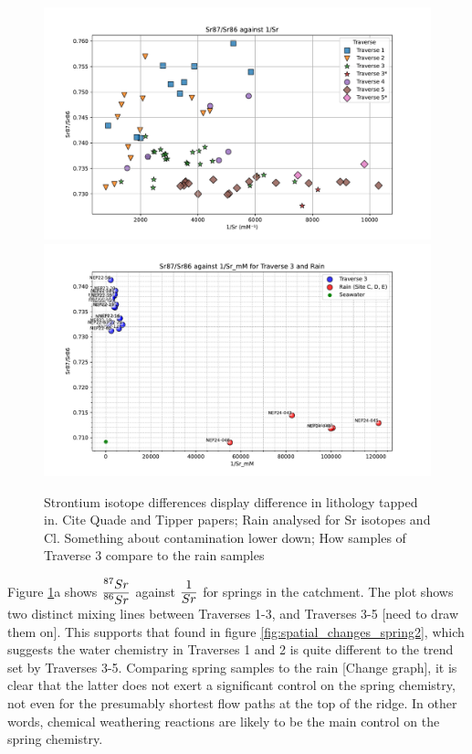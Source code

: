 \begin{figure}[p]
    \centering
    \includegraphics[width=\textwidth]{Sr87_Sr86_1_Sr.pdf}
    \includegraphics[width=\textwidth]{Sr87_Sr86_1Sr_Rain.pdf}
    \caption{Strontium isotope differences display difference in lithology tapped in. Cite Quade and Tipper papers; Rain analysed for Sr isotopes and Cl. Something about contamination lower down; How samples of Traverse 3 compare to the rain samples}
    \label{fig:discussion3}
\end{figure}

\FloatBarrier

Figure \ref{fig:discussion3}a shows $\ddfrac{^{87}Sr}{^{86}Sr}$ against $\ddfrac{1}{Sr}$ for springs in the catchment. The plot shows two distinct mixing lines between Traverses 1-3, and Traverses 3-5 [need to draw them on]. This supports that found in figure \ref{fig:spatial_changes_spring2}, which suggests the water chemistry in Traverses 1 and 2 is quite different to the trend set by Traverses 3-5. Comparing spring samples to the rain [Change graph], it is clear that the latter does not exert a significant control on the spring chemistry, not even for the presumably shortest flow paths at the top of the ridge. In other words, chemical weathering reactions are likely to be the main control on the spring chemistry.


